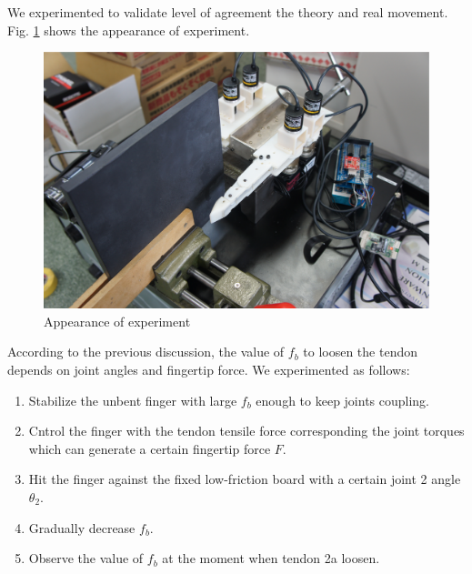\documentclass{llncs}
\begin{document}
We experimented to validate level of agreement the theory and real movement.
Fig. \ref{pic:experiment} shows the appearance of experiment.
\begin{figure}[tbhp]
	\centering
	\includegraphics[width=.60\textwidth]{./figure/JPG/experiment2.eps}
	\caption{Appearance of experiment}
	\label{pic:experiment}
\end{figure}
According to the previous discussion, the value of $f_b$ to loosen the tendon depends on joint angles and fingertip force.
We experimented as follows:
\begin{enumerate}
	\item Stabilize the unbent finger with large $f_b$ enough to keep joints coupling.
	\item Cntrol the finger with the tendon tensile force corresponding the joint torques which can generate a certain fingertip force $F$.
	\item Hit the finger against the fixed low-friction board with a certain joint 2 angle $\theta_2$.
	\item Gradually decrease $f_b$.
	\item Observe the value of $f_b$ at the moment when tendon 2a loosen.
\end{enumerate}
\end{document}
